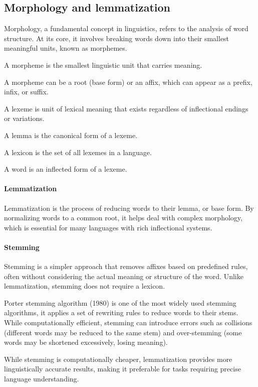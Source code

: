 \subsection{Morphology and lemmatization}
Morphology, a fundamental concept in linguistics, refers to the analysis of word structure.
At its core, it involves breaking words down into their smallest meaningful units, known as morphemes.
\begin{definition}
    A morpheme is the smallest linguistic unit that carries meaning.
\end{definition}
\noindent A morpheme can be a root (base form) or an affix, which can appear as a prefix, infix, or suffix.
\begin{definition}
    A lexeme is unit of lexical meaning that exists regardless of inflectional endings or variations.
\end{definition}
\begin{definition}
    A lemma is the canonical form of a lexeme.
\end{definition}
\begin{definition}
   A lexicon is the set of all lexemes in a language.
\end{definition}
\begin{definition}
    A word is an inflected form of a lexeme.
\end{definition}

\paragraph*{Lemmatization}
Lemmatization is the process of reducing words to their lemma, or base form. 
By normalizing words to a common root, it helps deal with complex morphology, which is essential for many languages with rich inflectional systems.

\paragraph*{Stemming}
Stemming is a simpler approach that removes affixes based on predefined rules, often without considering the actual meaning or structure of the word. 
Unlike lemmatization, stemming does not require a lexicon.

Porter stemming algorithm (1980) is one of the most widely used stemming algorithms, it applies a set of rewriting rules to reduce words to their stems. 
While computationally efficient, stemming can introduce errors such as collisions (different words may be reduced to the same stem) and over-stemming (some words may be shortened excessively, losing meaning).

While stemming is computationally cheaper, lemmatization provides more linguistically accurate results, making it preferable for tasks requiring precise language understanding.